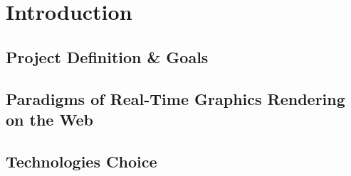 \chapter{Introduction}
\section{Project Definition \& Goals}
\section{Paradigms of Real-Time Graphics Rendering on the Web}
\section{Technologies Choice}
